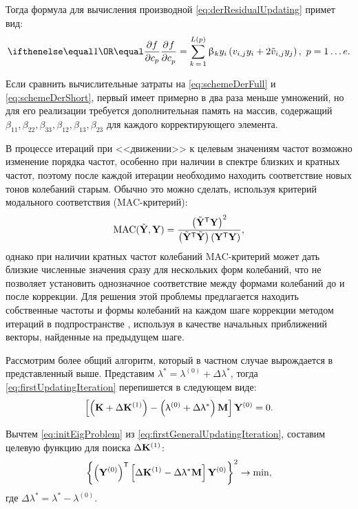 Тогда формула для вычисления производной \eqref{eq:derResidualUpdating} примет вид:
\begin{equation}
	\partDer{f}{c_p}{} = \sum\limits_{k\,=\,1} ^ {L(p)} \beta_k y_i \rbrackets{v_{i, j} y_i + 2 \tilde{v}_{i, j} y_j}, \ p = 1 \hdots e.
	\label{eq:schemeDerShort}
\end{equation}

Если сравнить вычислительные затраты на \eqref{eq:schemeDerFull} и \eqref{eq:schemeDerShort}, первый имеет примерно в два раза меньше умножений, но для его реализации требуется дополнительная память на массив, содержащий $ \beta_{11}, \beta_{22}, \beta_{33}, \beta_{12}, \beta_{13}, \beta_{23} $ для каждого корректирующего элемента. 

В процессе итераций при <<движении>> к целевым значениям частот возможно изменение порядка частот, особенно при наличии в спектре близких и кратных частот, поэтому после каждой итерации необходимо находить соответствие новых тонов колебаний старым. Обычно это можно сделать, используя критерий модального соответствия (MAC-критерий):
\begin{equation}
	\text{MAC}(\tilde{\mathbf{Y}}, \mathbf{Y}) = \frac{\left( \tilde{\mathbf{Y}} ^ \mathsf{T} \mathbf{Y} \right) ^ 2}{\left( \tilde{\mathbf{Y}} ^ \mathsf{T} \tilde{\mathbf{Y}} \right) \left( \mathbf{Y} ^ \mathsf{T} \mathbf{Y} \right)},
	\label{eq:MAC}
\end{equation}
однако при наличии кратных частот колебаний MAC-критерий может дать близкие численные значения сразу для нескольких форм колебаний, что не позволяет установить однозначное соответствие между формами колебаний до и после коррекции. Для решения этой проблемы предлагается находить собственные частоты и формы колебаний на каждом шаге коррекции методом итераций в подпространстве \cite{lib:modelUpdating:Bathe}, используя в качестве начальных приближений векторы, найденные на предыдущем шаге.

Рассмотрим более общий алгоритм, который в частном случае вырождается в представленный выше. Представим $ \lambda ^ \ast = \lambda ^ {(0)} + \Delta \lambda ^ \ast $, тогда \eqref{eq:firstUpdatingIteration} перепишется в следующем виде:
\begin{equation}
	\left[ \left( \mathbf{K} + \Delta \mathbf{K} ^ {(1)} \right) - \left( \uplambda ^ {(0)} + \Delta \uplambda ^ \ast \right) \mathbf{M} \right] \mathbf{Y} ^ {(0)} = 0.
	\label{eq:firstGeneralUpdatingIteration}
\end{equation}

Вычтем \eqref{eq:initEigProblem} из \eqref{eq:firstGeneralUpdatingIteration}, составим целевую функцию для поиска $ \Delta \mathbf{K} ^ {(1)} $:
\begin{equation}
	\left\{ \left( \mathbf{Y}^ {(0)} \right) ^ \mathsf{T} \left[  \Delta \mathbf{K} ^ {(1)} - \Delta \uplambda ^ {\ast} \mathbf{M} \right] \mathbf{Y} ^ {(0)}  \right\} ^ 2 \rightarrow \min,
	\label{eq:objFunGeneralUpdating}
\end{equation}
где $ \Delta \lambda ^ \ast = \lambda ^ \ast - \lambda ^ {(0)}$.


